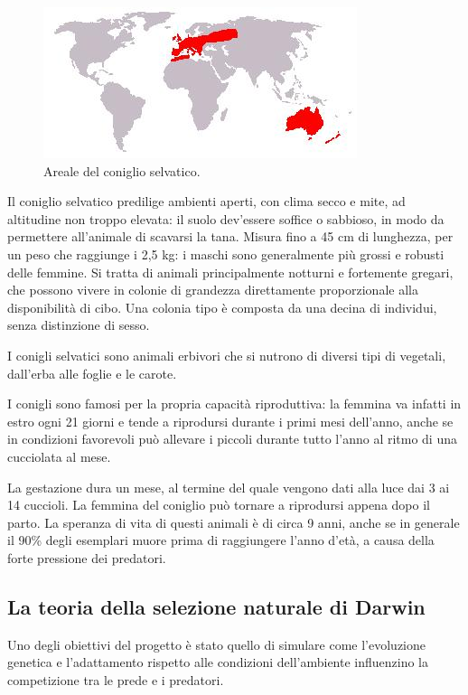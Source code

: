 \documentclass[11pt]{article}
\begin{document}
\begin{figure}[h]
    \centering
    \includegraphics[scale = 1]{ArealeDelConiglioSelvatico.jpeg}
    \caption{Areale del coniglio selvatico.}
    \label{figArealeConiglio}
\end{figure}

Il coniglio selvatico predilige ambienti aperti, con clima secco e mite, ad altitudine non troppo elevata: il suolo dev'essere soffice o sabbioso, in modo da permettere all'animale di scavarsi la tana. Misura fino a 45 cm di lunghezza, per un peso che raggiunge i 2,5 kg: i maschi sono generalmente più grossi e robusti delle femmine. Si tratta di animali principalmente notturni e fortemente gregari, che possono vivere in colonie di grandezza direttamente proporzionale alla disponibilità di cibo. Una colonia tipo è composta da una decina di individui, senza distinzione di sesso. 

I conigli selvatici sono animali erbivori che si nutrono di diversi tipi di vegetali, dall'erba alle foglie e le carote.

I conigli sono famosi per la propria capacità riproduttiva: la femmina va infatti in estro ogni 21 giorni e tende a riprodursi durante i primi mesi dell'anno, anche se in condizioni favorevoli può allevare i piccoli durante tutto l'anno al ritmo di una cucciolata al mese. 

La gestazione dura un mese, al termine del quale vengono dati alla luce dai 3 ai 14 cuccioli. La femmina del coniglio può tornare a riprodursi appena dopo il parto\cite{Gattoni2019Apr}.  La speranza di vita di questi animali è di circa 9 anni, anche se in generale il 90\% degli esemplari muore prima di raggiungere l'anno d'età, a causa della forte pressione dei predatori. 

\subsection{La teoria della selezione naturale di Darwin}
Uno degli obiettivi del progetto è stato quello di simulare come l'evoluzione genetica e l'adattamento rispetto alle condizioni dell'ambiente influenzino la competizione tra le prede e i predatori. 
\end{document}
